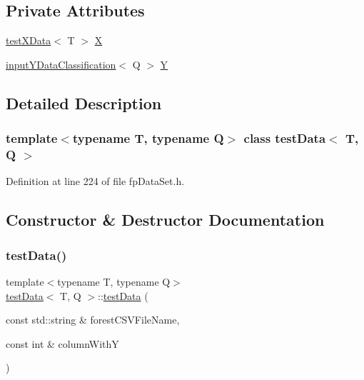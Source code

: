 \subsection*{Private Attributes}
\begin{DoxyCompactItemize}
\item 
\hyperlink{classtestXData}{test\+X\+Data}$<$ T $>$ \hyperlink{classtestData_aaed20c168b252c39fb9dc56757315eee}{X}
\item 
\hyperlink{classinputYDataClassification}{input\+Y\+Data\+Classification}$<$ Q $>$ \hyperlink{classtestData_a97961fe071062be1146fcbcb1aaf7a00}{Y}
\end{DoxyCompactItemize}


\subsection{Detailed Description}
\subsubsection*{template$<$typename T, typename Q$>$\newline
class test\+Data$<$ T, Q $>$}



Definition at line 224 of file fp\+Data\+Set.\+h.



\subsection{Constructor \& Destructor Documentation}
\mbox{\label{classtestData_ad327e412899d5f05b97d4f84ea21efb3}} 
\subsubsection{\texorpdfstring{test\+Data()}{testData()}}
{\footnotesize\ttfamily template$<$typename T, typename Q$>$ \\
\hyperlink{classtestData}{test\+Data}$<$ T, Q $>$\+::\hyperlink{classtestData}{test\+Data} (\begin{DoxyParamCaption}\item[{const std\+::string \&}]{forest\+C\+S\+V\+File\+Name,  }\item[{const int \&}]{column\+WithY }\end{DoxyParamCaption})\hspace{0.3cm}{\ttfamily [inline]}}



